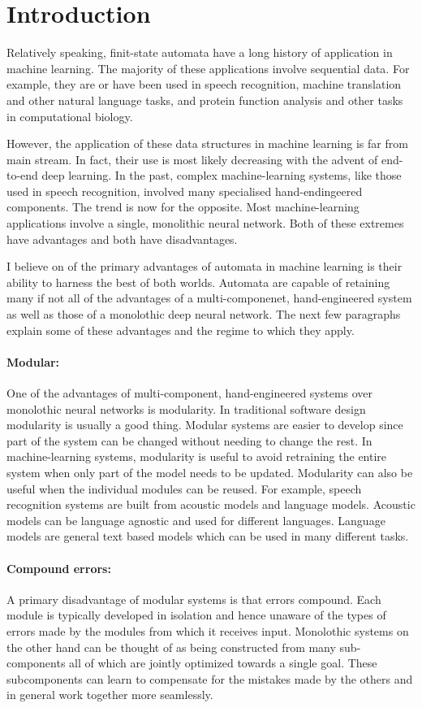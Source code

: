 \documentclass[main.tex]{subfiles}
\begin{document}
\section{Introduction}
\label{sec:introduction}

Relatively speaking, finit-state automata have a long history of application in
machine learning. The majority of these applications involve sequential data.
For example, they are or have been used in speech recognition, machine
translation and other natural language tasks, and protein function analysis and
other tasks in computational biology.

However, the application of these data structures in machine learning is far
from main stream. In fact, their use is most likely decreasing with the advent
of end-to-end deep learning. In the past, complex machine-learning systems,
like those used in speech recognition, involved many specialised
hand-endingeered components. The trend is now for the opposite. Most
machine-learning applications involve a single, monolithic neural network. Both
of these extremes have advantages and both have disadvantages.

I believe on of the primary advantages of automata in machine learning is their
ability to harness the best of both worlds. Automata are capable of retaining
many if not all of the advantages of a multi-componenet, hand-engineered system
as well as those of a monolothic deep neural network. The next few
paragraphs explain some of these advantages and the regime to which they apply.

\paragraph{Modular:} One of the advantages of multi-component, hand-engineered
systems over monolothic neural networks is modularity. In traditional software
design modularity is usually a good thing. Modular systems are easier to
develop since part of the system can be changed without needing to change the
rest. In machine-learning systems, modularity is useful to avoid retraining the
entire system when only part of the model needs to be updated. Modularity can
also be useful when the individual modules can be reused. For example, speech
recognition systems are built from acoustic models and language models.
Acoustic models can be language agnostic and used for different languages.
Language models are general text based models which can be used in many
different tasks.

\paragraph{Compound errors:} A primary disadvantage of modular systems is that
errors compound. Each module is typically developed in isolation and hence
unaware of the types of errors made by the modules from which it receives
input. Monolothic systems on the other hand can be thought of as being
constructed from many sub-components all of which are jointly optimized towards
a single goal. These subcomponents can learn to compensate for the mistakes
made by the others and in general work together more seamlessly.
\end{document}
